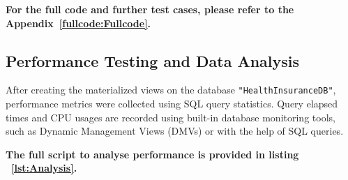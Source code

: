   

\textbf{For the full code and further test cases, please refer to the Appendix~\ref{fullcode:Fullcode}.}


\subsection{Performance Testing and Data Analysis} After creating the materialized views on the database \texttt{"HealthInsuranceDB"}, performance metrics were collected using SQL query statistics. Query elapsed times and CPU usages are recorded using built-in database monitoring tools, such as Dynamic Management Views (DMVs) or with the help of SQL queries. \vspace{.4cm}

 

 \textbf{The full script to analyse performance is provided in listing ~\ref{lst:Analysis}.}

